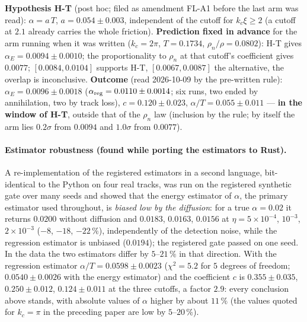 \documentclass[11pt,a4paper]{article}
\begin{document}
\begin{keybox}
\textbf{Hypothesis H-T} (post hoc; filed as amendment FL-A1 before the last arm was read): $\alpha=a\,T$, $a=0.054\pm0.003$, independent of the cutoff for $k_c\xi\ge2$ (a cutoff at $2.1$ already carries the whole friction).
\textbf{Prediction fixed in advance} for the arm running when it was written ($k_c=2\pi$, $T=0.1734$, $\rho_n/\rho=0.0802$): H-T gives $\alpha_E=0.0094\pm0.0010$; the proportionality to $\rho_n$ at that cutoff's coefficient gives $0.0077$;
$[0.0084,0.0104]$ supports H-T, $[0.0067,0.0087]$ the alternative, the overlap is inconclusive.
\textbf{Outcome} (read 2026-10-09 by the pre-written rule): $\alpha_E=0.0096\pm0.0018$ ($\alpha_{\rm reg}=0.0110\pm0.0014$; six runs, two ended by annihilation, two by track loss), $c=0.120\pm0.023$, $\alpha/T=0.055\pm0.011$ --- \textbf{in the window of H-T}, outside that of the $\rho_n$ law (inclusion by the rule; by itself the arm lies $0.2\sigma$ from $0.0094$ and $1.0\sigma$ from $0.0077$).
\end{keybox}

\paragraph{Estimator robustness (found while porting the estimators to Rust).} A re-implementation of the registered estimators in a second language, bit-identical to the Python on four real tracks, was run on the registered synthetic gate over many seeds
and showed that the energy estimator of $\alpha$, the primary estimator used throughout, is \emph{biased low by the diffusion}: for a true $\alpha=0.02$ it returns $0.0200$ without diffusion and $0.0183$, $0.0163$, $0.0156$ at $\eta=5\times10^{-4}$, $10^{-3}$, $2\times10^{-3}$
($-8$, $-18$, $-22\,\%$), independently of the detection noise, while the regression estimator is unbiased ($0.0194$); the registered gate passed on one seed. In the data the two estimators differ by $5$--$21\,\%$ in that direction. With the regression estimator
$\alpha/T=0.0598\pm0.0023$ ($\chi^2=5.2$ for $5$ degrees of freedom; $0.0540\pm0.0026$ with the energy estimator) and the coefficient $c$ is $0.355\pm0.035$, $0.250\pm0.012$, $0.124\pm0.011$ at the three cutoffs, a factor $2.9$: every conclusion above stands, with
absolute values of $\alpha$ higher by about $11\,\%$ (the values quoted for $k_c=\pi$ in the preceding paper are low by $5$--$20\,\%$).
\end{document}
